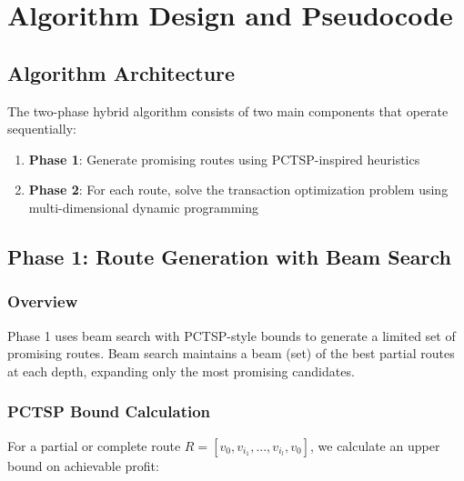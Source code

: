 \documentclass[12pt]{article}
\begin{document}
\section{Algorithm Design and Pseudocode}
\label{sec:algorithm_design}

\subsection{Algorithm Architecture}

The two-phase hybrid algorithm consists of two main components that operate sequentially:

\begin{enumerate}
    \item \textbf{Phase 1}: Generate promising routes using PCTSP-inspired heuristics
    \item \textbf{Phase 2}: For each route, solve the transaction optimization problem using multi-dimensional dynamic programming
\end{enumerate}

\subsection{Phase 1: Route Generation with Beam Search}

\subsubsection{Overview}

Phase 1 uses beam search with PCTSP-style bounds to generate a limited set of promising routes. Beam search maintains a beam (set) of the best partial routes at each depth, expanding only the most promising candidates.

\subsubsection{PCTSP Bound Calculation}

For a partial or complete route $R = [v_0, v_{i_1}, ..., v_{i_l}, v_0]$, we calculate an upper bound on achievable profit:
\end{document}
